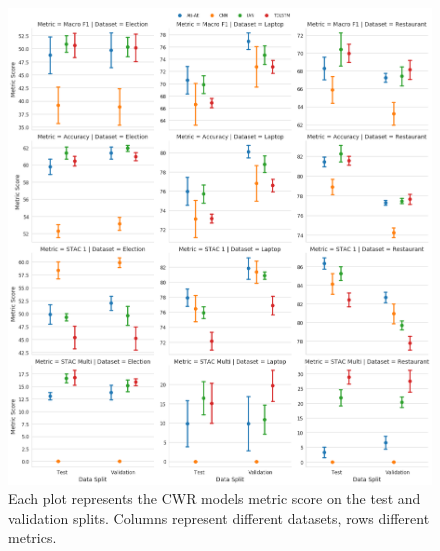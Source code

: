 \begin{figure}[!h]
    \centering
    \includegraphics[scale=0.3]{images/augmentation/methods_performance/CWR/overall_cwr_results.png}
    \caption{Each plot represents the CWR models metric score on the test and validation splits. Columns represent different datasets, rows different metrics.}
    \label{fig:aug_overall_cwr_results}
\end{figure}

